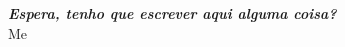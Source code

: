 \thispagestyle{empty}
\hbox{} \vfill
\begin{flushright}
\small \textit{\textbf{Espera, tenho que escrever aqui alguma coisa?}}\\ \vspace{2mm}  
\scriptsize Me
\end{flushright}

\clearpage
\thispagestyle{empty}
\cleardoublepage
